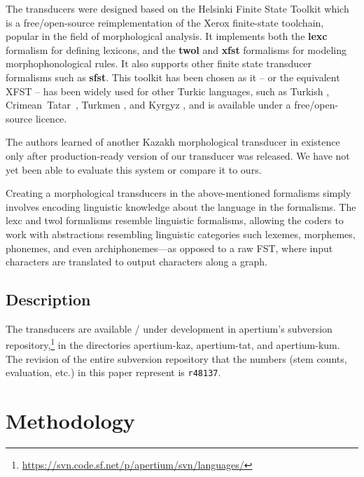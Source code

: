 \documentclass[a4paper,11pt,twocolumn]{article}
\begin{document}
The transducers were designed based on the Helsinki Finite State Toolkit \citep{hfst/2011} which is a free/open-source reimplementation of the Xerox finite-state toolchain, popular in the field of morphological analysis.  It implements both the \textbf{lexc} formalism for defining lexicons, and the \textbf{twol} and \textbf{xfst} formalisms for modeling morphophonological rules.  It also supports other finite state transducer formalisms such as \textbf{sfst}.  This toolkit has been chosen as it -- or the equivalent XFST -- has been widely used for other Turkic languages, such as Turkish \citep{coltekin2010}, Crimean~Tatar~\citep{altintas2001}, Turkmen \citep{tantug2006}, and Kyrgyz \citep{washington2012}, and is available under a free/open-source licence.

The authors learned of another Kazakh morphological transducer in existence \citep{bekmanova2013} only after production-ready version of our transducer was released.  We have not yet been able to evaluate this system or compare it to ours.

Creating a morphological transducers in the above-mentioned formalisms simply involves encoding linguistic knowledge about the language in the formalisms.  The lexc and twol formalisms resemble linguistic formalisms, allowing the coders to work with abstractions resembling linguistic categories such lexemes, morphemes, phonemes, and even archiphonemes---as opposed to a raw FST, where input characters are translated to output characters along a graph.

\subsection{Description}

The transducers are available / under development in apertium's subversion repository,\footnote{\url{https://svn.code.sf.net/p/apertium/svn/languages/}} in the directories apertium-kaz, apertium-tat, and apertium-kum.  The revision of the entire subversion repository that the numbers (stem counts, evaluation, etc.) in this paper represent is \texttt{r48137}.


\section{Methodology}

\end{document}
